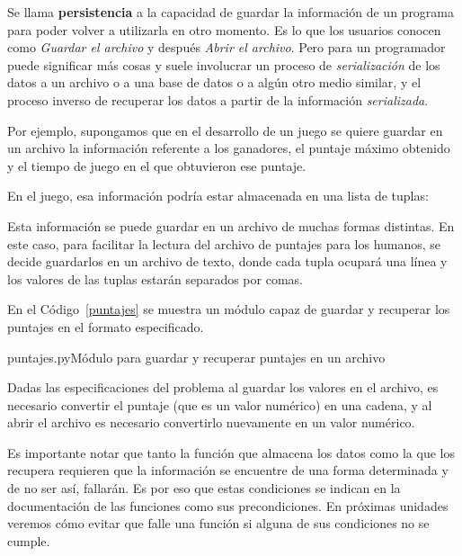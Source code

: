 Se llama {\bf persistencia} a la capacidad de guardar la
información de un programa para poder volver a utilizarla en otro
momento. Es lo que los usuarios conocen como \emph{Guardar el archivo}
y después \emph{Abrir el archivo}. Pero para un programador puede
significar más cosas y suele involucrar un proceso de
\emph{serialización} de los datos a un archivo o a una base de datos o a
algún otro medio similar, y el proceso inverso de recuperar los
datos a partir de la información \emph{serializada}.


Por ejemplo, supongamos que en el desarrollo de un juego se quiere guardar
en un archivo la información referente a los ganadores, el puntaje máximo
obtenido y el tiempo de juego en el que obtuvieron ese puntaje.

En el juego, esa información podría estar almacenada en una lista de
tuplas:
\begin{codigo-python-sn}
\end{codigo-python-sn}

Esta información se puede guardar en un archivo de muchas formas distintas.
En este caso, para facilitar la lectura del archivo de puntajes para los
humanos, se decide guardarlos en un archivo de texto, donde cada tupla
ocupará una línea y los valores de las tuplas estarán separados por
comas.

En el Código~\ref{puntajes} se muestra un módulo capaz de guardar y
recuperar los puntajes en el formato especificado.

\begin{codigo}{puntajes.py}{Módulo para guardar y recuperar puntajes en un archivo}
\label{puntajes}

\end{codigo}

Dadas las especificaciones del problema al guardar los valores en el
archivo, es necesario convertir el puntaje (que es un valor numérico) en
una cadena, y al abrir el archivo es necesario convertirlo nuevamente en un
valor numérico.

\begin{observacion}
Es importante notar que tanto la función que almacena los datos como la que
los recupera requieren que la información se encuentre de una forma
determinada y de no ser así, fallarán.  Es por eso que estas condiciones se
indican en la documentación de las funciones como sus precondiciones. En
próximas unidades veremos cómo evitar que falle una función si alguna de
sus condiciones no se cumple.
\end{observacion}


